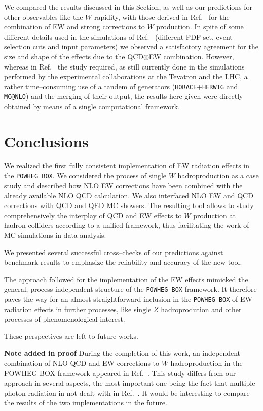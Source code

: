 \documentclass[11pt,a4paper]{article}
\newcommand\POWHEGBOX{\texttt{POWHEG BOX}}
\begin{document}
We compared the results discussed in this Section, as well as our predictions for other observables like the $W$ rapidity, with those 
derived in Ref.~\cite{Balossini:2009sa} for the 
combination of EW and strong corrections to $W$ production. In spite of some different details used in the simulations of 
Ref.~\cite{Balossini:2009sa} (different PDF set, event selection cuts 
and input parameters) we observed 
a satisfactory agreement
for the size and shape of the effects due to the QCD$\otimes$EW combination. However, whereas in Ref.~\cite{Balossini:2009sa} the study required, as still currently done in the simulations performed by the experimental collaborations at the Tevatron and the LHC, a rather time--consuming use of a tandem of generators 
(\texttt{HORACE}+\texttt{HERWIG} and \texttt{MC@NLO}) and the 
merging of their output, the results here given were 
directly obtained by means of a single computational framework.

\section{Conclusions}
\label{sec:concl}

We realized the first fully consistent implementation of EW radiation effects in the \POWHEGBOX{}. We considered the process of single 
$W$ hadroproduction as a case study and 
described how NLO EW corrections have been combined with the already available NLO QCD calculation. We also interfaced NLO EW and QCD corrections with 
QCD and QED MC showers. The resulting tool allows to study comprehensively the interplay of QCD and EW effects to $W$ production at hadron colliders 
according to a unified framework, thus facilitating the work of MC simulations in data analysis.

We presented several successful cross--checks of our predictions against benchmark results to emphasize the reliability and accuracy of the new tool.

The approach followed for the implementation of the EW effects mimicked the general, process independent structure of the 
\POWHEGBOX{} framework. It therefore 
paves the way for an almost straightforward inclusion in the \POWHEGBOX{} of EW radiation effects in further processes, like single $Z$ hadroprodution and other processes of
phenomenological interest. 

These perspectives are left to future works.

\vskip 12pt\noindent
{\bf \large Note added in proof}
\vskip 8pt\noindent
During the completion of this work, an independent combination of NLO
QCD and EW corrections to $W$ hadroproduction in the POWHEG BOX framework
appeared in Ref.~\cite{Bernaciak:2012hj}. This study differs from our approach in several
aspects, the most important one being the fact that multiple photon
radiation in not dealt with in Ref.~\cite{Bernaciak:2012hj}. It would be interesting to compare
the results of the two implementations in the future.
\end{document}
